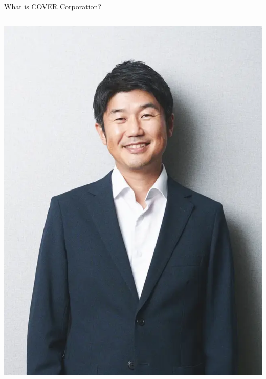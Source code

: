 \documentclass[aspectratio=169]{beamer}
\begin{document}
\begin{frame}{What is COVER Corporation?}
\begin{columns}
\begin{column}{0.25\textwidth}
            \includegraphics[width=\linewidth]{images/yagoo.png}
        \end{column}
    \end{columns}
\end{frame}
\end{document}
